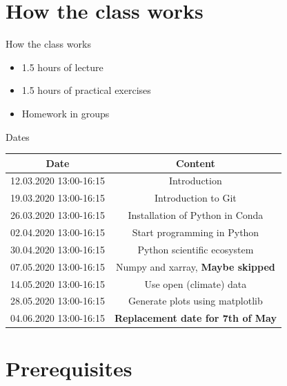 \documentclass[10pt,color=usenames,dvipsnames]{beamer}
\begin{document}
\section{How the class works}

\begin{frame}{How the class works}
	\begin{itemize}
		\item 1.5 hours of lecture
		\item 1.5 hours of practical exercises
		\item Homework in groups
	\end{itemize}
\end{frame}

\begin{frame}{Dates}

	\begin{table}

	\begin{tabular}{|c|c|}
		\hline
		Date&Content\\
		\hline
		12.03.2020	13:00-16:15	& Introduction \\

		19.03.2020	13:00-16:15&Introduction to Git\\

		26.03.2020	13:00-16:15&Installation of Python in Conda\\

		02.04.2020	13:00-16:15&Start programming in Python\\

		30.04.2020	13:00-16:15&Python scientific ecosystem\\

		07.05.2020	13:00-16:15&Numpy and xarray, \textbf{Maybe skipped}\\

		14.05.2020	13:00-16:15& Use open (climate) data\\

		28.05.2020	13:00-16:15&Generate plots using matplotlib\\

		04.06.2020  13:00-16:15&\textbf{Replacement date for 7th of May}\\
		\hline
	\end{tabular}
\end{table}

\end{frame}


\section{Prerequisites}
\end{document}
